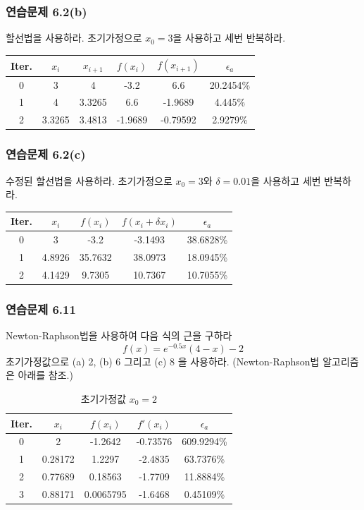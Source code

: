 \subsubsection{연습문제 6.2(b)}
할선법을 사용하라. 초기가정으로 $x_0 =3$을 사용하고 세번 반복하라.
\begin{table}[!hbpt]
\centering
\begin{tabular}{c|c|c|c|c|c}
\hline\hline
Iter.&$x_{i}$&$x_{i+1}$&$f(x_{i})$&$f(x_{i+1})$&$\epsilon_{a}$\\
\hline
0&3&4&-3.2&6.6&20.2454\%\\
1&4&3.3265&6.6&-1.9689&4.445\%\\
2&3.3265&3.4813&-1.9689&-0.79592&2.9279\%\\
\hline\hline
\end{tabular}
\end{table}

\subsubsection{연습문제 6.2(c)}
수정된 할선법을 사용하라. 초기가정으로 $x_0 =3$와 $\delta=0.01$을 사용하고 세번 반복하라.
\begin{table}[!hbpt]
\centering
\begin{tabular}{c|c|c|c|c}
\hline\hline
Iter.&$x_{i}$&$f(x_{i})$&$f(x_{i}+\delta x_{i})$&$\epsilon_{a}$\\
\hline
0&3&-3.2&-3.1493&38.6828\%\\
1&4.8926&35.7632&38.0973&18.0945\%\\
2&4.1429&9.7305&10.7367&10.7055\%\\
\hline\hline
\end{tabular}
\end{table}

\subsubsection{연습문제 6.11}
Newton-Raphson법을 사용하여 다음 식의 근을 구하라
\begin{displaymath}
f(x)=e^{-0.5x}(4-x)-2
\end{displaymath}
초기가정값으로 (a) 2, (b) 6 그리고 (c) 8 을 사용하라. (Newton-Raphson법 알고리즘은 아래를 참조.)

\begin{table}[!hbpt]
\centering
\begin{tabular}{c|c|c|c|c}
\hline\hline
Iter.&$x_{i}$&$f(x_{i})$&$f'(x_{i})$&$\epsilon_{a}$\\
\hline
0&2&-1.2642&-0.73576&609.9294\%\\
1&0.28172&1.2297&-2.4835&63.7376\%\\
2&0.77689&0.18563&-1.7709&11.8884\%\\
3&0.88171&0.0065795&-1.6468&0.45109\%\\
\hline\hline
\end{tabular}
\caption{초기가정값 $x_{0}=2$}
\end{table}

